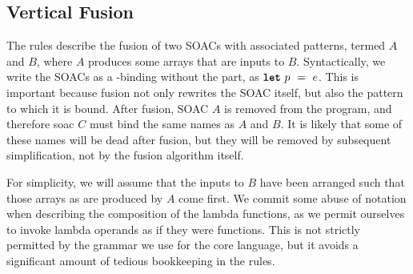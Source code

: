 \subsection{Vertical Fusion}

The rules describe the fusion of two SOACs with associated patterns,
termed $A$ and $B$, where $A$ produces some arrays that are inputs to
$B$.  Syntactically, we write the SOACs as a -binding without
the  part, as $\mbox{\texttt{\bfseries{let}}}~p~=~e$.  This is important because
fusion not only rewrites the SOAC itself, but also the pattern to
which it is bound.  After fusion, SOAC $A$ is removed from the
program, and therefore soac $C$ must bind the same names as $A$ and
$B$.  It is likely that some of these names will be dead after fusion,
but they will be removed by subsequent simplification, not by the
fusion algorithm itself.

For simplicity, we will assume that the inputs to $B$ have been
arranged such that those arrays as are produced by $A$ come first.  We
commit some abuse of notation when describing the composition of the
lambda functions, as we permit ourselves to invoke lambda operands as
if they were functions.  This is not strictly permitted by the grammar
we use for the core language, but it avoids a significant amount of
tedious bookkeeping in the rules.

